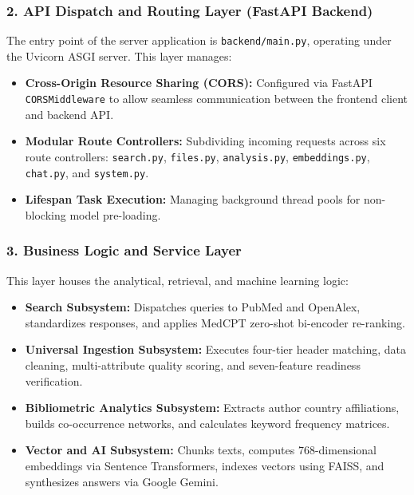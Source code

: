 \subsubsection{2. API Dispatch and Routing Layer (FastAPI Backend)}
The entry point of the server application is \texttt{backend/main.py}, operating under the Uvicorn ASGI server. This layer manages:
\begin{itemize}
    \item \textbf{Cross-Origin Resource Sharing (CORS):} Configured via FastAPI \texttt{CORSMiddleware} to allow seamless communication between the frontend client and backend API.
    \item \textbf{Modular Route Controllers:} Subdividing incoming requests across six route controllers: \texttt{search.py}, \texttt{files.py}, \texttt{analysis.py}, \texttt{embeddings.py}, \texttt{chat.py}, and \texttt{system.py}.
    \item \textbf{Lifespan Task Execution:} Managing background thread pools for non-blocking model pre-loading.
\end{itemize}

\subsubsection{3. Business Logic and Service Layer}
This layer houses the analytical, retrieval, and machine learning logic:
\begin{itemize}
    \item \textbf{Search Subsystem:} Dispatches queries to PubMed and OpenAlex, standardizes responses, and applies MedCPT zero-shot bi-encoder re-ranking.
    \item \textbf{Universal Ingestion Subsystem:} Executes four-tier header matching, data cleaning, multi-attribute quality scoring, and seven-feature readiness verification.
    \item \textbf{Bibliometric Analytics Subsystem:} Extracts author country affiliations, builds co-occurrence networks, and calculates keyword frequency matrices.
    \item \textbf{Vector and AI Subsystem:} Chunks texts, computes 768-dimensional embeddings via Sentence Transformers, indexes vectors using FAISS, and synthesizes answers via Google Gemini.
\end{itemize}

